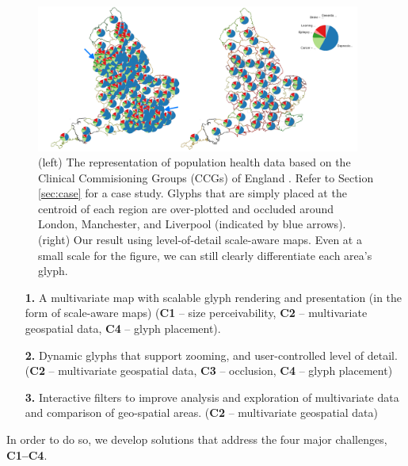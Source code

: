 \begin{figure}[t]
\centering
\includegraphics[width=0.95\textwidth]{images/ch5/ccgsetPie2}
\caption{(left) The representation of population health data based on the Clinical Commisioning Groups (CCGs) of England \cite{publicHealthEngland}. Refer to Section \ref{sec:case} for a case study. Glyphs that are simply placed at the centroid of each region are over-plotted and occluded around London, Manchester, and Liverpool (indicated by blue arrows). (right) Our result using level-of-detail scale-aware maps. Even at a small scale for the figure, we can still clearly differentiate each area's glyph.} \label{fig:ccgs}
\end{figure}
\begin{itemize}[labelindent=0em, labelsep=0.2cm, leftmargin=*]
\item[\textbf{1.}] A multivariate map with scalable glyph rendering and presentation (in the form of scale-aware maps) (\textbf{C1} -- size perceivability, \textbf{C2} -- multivariate geospatial data, \textbf{C4} -- glyph placement).
\item[\textbf{2.}] Dynamic glyphs that support zooming, and user-controlled level of detail. (\textbf{C2} -- multivariate geospatial data, \textbf{C3} -- occlusion, \textbf{C4} -- glyph placement)
\item[\textbf{3.}] Interactive filters to improve analysis and exploration of multivariate data and comparison of geo-spatial areas. (\textbf{C2} -- multivariate geospatial data)
\end{itemize}
In order to do so, we develop solutions that address the four major challenges, \textbf{C1--C4}.


